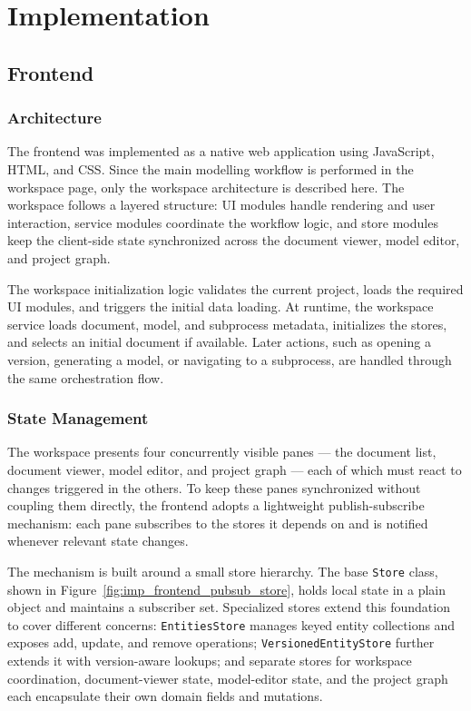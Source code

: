 \FloatBarrier
\chapter{Implementation}
\label{sec:implementation}

\section{Frontend}
\subsection{Architecture}
The frontend was implemented as a native web application using JavaScript, HTML, and CSS. Since the main modelling workflow is performed in the workspace page, only the workspace architecture is described here. The workspace follows a layered structure: UI modules handle rendering and user interaction, service modules coordinate the workflow logic, and store modules keep the client-side state synchronized across the document viewer, model editor, and project graph.

The workspace initialization logic validates the current project, loads the required UI modules, and triggers the initial data loading. At runtime, the workspace service loads document, model, and subprocess metadata, initializes the stores, and selects an initial document if available. Later actions, such as opening a version, generating a model, or navigating to a subprocess, are handled through the same orchestration flow.

\subsection{State Management}

The workspace presents four concurrently visible panes — the document list, document viewer, model editor, and project graph — each of which must react to changes triggered in the others. To keep these panes synchronized without coupling them directly, the frontend adopts a lightweight publish-subscribe mechanism: each pane subscribes to the stores it depends on and is notified whenever relevant state changes.

The mechanism is built around a small store hierarchy. The base \texttt{Store} class, shown in Figure~\ref{fig:imp_frontend_pubsub_store}, holds local state in a plain object and maintains a subscriber set. Specialized stores extend this foundation to cover different concerns: \texttt{EntitiesStore} manages keyed entity collections and exposes add, update, and remove operations; \texttt{VersionedEntityStore} further extends it with version-aware lookups; and separate stores for workspace coordination, document-viewer state, model-editor state, and the project graph each encapsulate their own domain fields and mutations.

